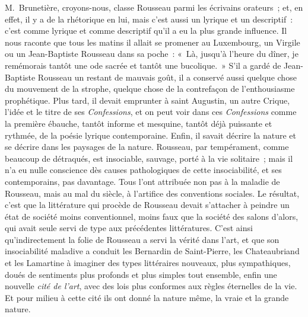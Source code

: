 \documentclass[french,twoside]{book} %
\begin{document}
M. Brunetière, croyons-nous, classe Rousseau parmi les écrivains orateurs ; et, en effet, il y a de la rhétorique en lui, mais c’est aussi un lyrique et un descriptif : c’est comme lyrique et comme descriptif qu’il a eu la plus grande influence. Il nous raconte que tous les matins il allait se promener au Luxembourg, un Virgile ou un Jean-Baptiste Rousseau dans sa poche : « Là, jusqu’à l’heure du dîner, je remémorais tantôt une ode sacrée et tantôt une bucolique. » S’il a gardé de Jean-Baptiste Rousseau un restant de mauvais goût, il a conservé aussi quelque chose du mouvement de la strophe, quelque chose de la contrefaçon de l’enthousiasme prophétique. Plus tard, il devait emprunter à saint Augustin, un autre Crique, l’idée et le titre de ses \emph{Confessions}, et on peut voir dans ces \emph{Confessions} comme la première ébauche, tantôt informe et mesquine, tantôt déjà puissante et rythmée, de la poésie lyrique contemporaine. Enfin, il savait décrire la nature et se décrire dans les paysages de la nature. Rousseau, par tempérament, comme beaucoup de détraqués, est insociable, sauvage, porté à la vie solitaire ; mais il n’a eu nulle conscience dès causes pathologiques de cette insociabilité, et ses contemporains, pas davantage. Tous l’ont attribuée non pas à la maladie de Rousseau, mais au mal du siècle, à l’artifice des conventions sociales. Le résultat, c’est que la littérature qui procède de Rousseau devait s’attacher à peindre un état de société moins conventionnel, moins faux que la société des salons d’alors, qui avait seule servi de type aux précédentes littératures. C’est ainsi qu’indirectement la folie de Rousseau a servi la vérité dans l’art, et que son insociabilité maladive a conduit les Bernardin de Saint-Pierre, les Chateaubriand et les Lamartine à imaginer des types littéraires nouveaux, plus sympathiques, doués de sentiments plus profonds et plus simples tout ensemble, enfin une nouvelle {\itshape cité de l’art}, avec des lois plus conformes aux règles éternelles de la vie. Et pour milieu à cette cité ils ont donné la nature même, la vraie et la grande nature.\par
\end{document}
